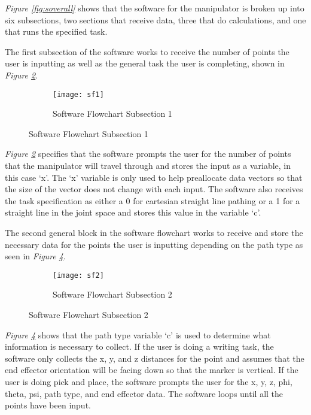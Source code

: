 \emph{Figure \ref{fig:soverall}} shows that the software for the manipulator is broken up into six subsections, two sections that receive data, three that do calculations, and one that runs the specified task.

The first subsection of the software works to receive the number of points the user is inputting as well as the general task the user is completing, shown in \emph{Figure \ref{fig:sf1}}. \\

\begin{figure}[htp] \ContinuedFloat
  \begin{subfigure}[c]{\textwidth}
  \center
  \texttt{[image: sf1]}
  \caption{Software Flowchart Subsection 1}
  \label{fig:sf1}
  \end{subfigure}
\end{figure}

\emph{Figure \ref{fig:sf1}} specifies that the software prompts the user for the number of points that the manipulator will travel through and stores the input as a variable, in this case ‘x’. The ‘x’ variable is only used to help preallocate data vectors so that the size of the vector does not change with each input. The software also receives the task specification as either a 0 for cartesian straight line pathing or a 1 for a straight line in the joint space and stores this value in the variable ‘c’.

The second general block in the software flowchart works to receive and store the necessary data for the points the user is inputting depending on the path type as seen in \emph{Figure \ref{fig:sf2}}.
\begin{figure}[htp] \ContinuedFloat
  \begin{subfigure}[c]{\textwidth}
  \center
  \texttt{[image: sf2]}
  \caption{Software Flowchart Subsection 2}
  \label{fig:sf2}
\end{subfigure}
\end{figure}

\emph{Figure \ref{fig:sf2}} shows that the path type variable ‘c’ is used to determine what information is necessary to collect. If the user is doing a writing task, the software only collects the x, y, and z distances for the point and assumes that the end effector orientation will be facing down so that the marker is vertical. If the user is doing pick and place, the software prompts the user for the x, y, z, phi, theta, psi, path type, and end effector data. The software loops until all the points have been input.

